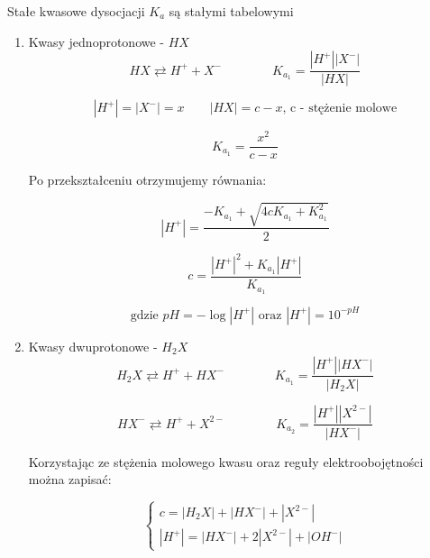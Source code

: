 \documentclass[polish,polish,a4paper,12pt]{article}
\begin{document}
		Stałe kwasowe dysocjacji $K_a$ są stałymi tabelowymi
		\begin{enumerate}
			\item Kwasy jednoprotonowe - $HX$
				\begin{equation*}
					HX \rightleftarrows H^+ + X^- \hspace{4em}K_{a_1} = \frac{|H^+||X^-|}{|HX|}
				\end{equation*}
			
				\begin{equation*}
					|H^+| = |X^-| = x \hspace{2em} |HX| = c-x \text{, c - stężenie molowe}
				\end{equation*}
			
				\begin{equation*}
					K_{a_1} = \frac{x^2}{c-x}
				\end{equation*}
			
				Po przekształceniu otrzymujemy równania:
				
				\begin{equation*}
					|H^+| = \frac{-K_{a_1} + \sqrt{4cK_{a_1} + K_{a_1}^2}}{2}
				\end{equation*}
			
				\begin{equation*}
					c = \frac{|H^+|^2+K_{a_1}|H^+|}{K_{a_1}}
				\end{equation*}
			
				\begin{equation*}
					\text{gdzie } pH = -\log |H^+| \text{ oraz } |H^+| = 10^{-pH}
				\end{equation*}
			
			\item Kwasy dwuprotonowe - $H_2X$
				\begin{equation*}
					H_2X \rightleftarrows H^+ + HX^- \hspace{4em} K_{a_1} = \frac{|H^+||HX^-|}{|H_2X|}
				\end{equation*}
			
				\begin{equation*}
					HX^- \rightleftarrows H^+ + X^{2-} \hspace{4em} K_{a_2} = \frac{|H^+||X^{2-}|}{|HX^-|}
				\end{equation*}
			
				Korzystając ze stężenia molowego kwasu oraz reguły elektroobojętności można zapisać:
				
				\begin{equation*}
					\begin{cases}
						c = |H_2X| + |HX^-| + |X^{2-}|\\
						|H^+| = |HX^-| + 2|X^{2-}| + |OH^-|
					\end{cases}
				\end{equation*}
			

\end{enumerate}
\end{document}
